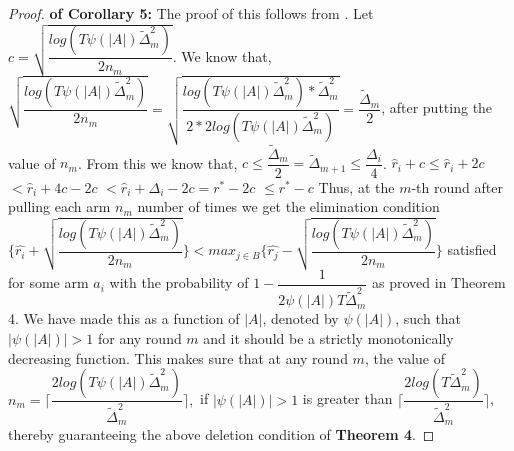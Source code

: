 \begin{proof}\textbf{ of Corollary 5:}
The proof of this follows from \citep{auer2010ucb}. Let $c=\sqrt{\dfrac{log({T\psi(|A|)\tilde{\Delta}_{m}^{2}})}{2n_{m}}} $.
We know  that,
$\sqrt{\dfrac{log({T\psi(|A|)\tilde{\Delta}_{m}^{2}})}{2n_{m}}} = \sqrt{\dfrac{log({T\psi(|A|)\tilde{\Delta}_{m}^{2}}) * \tilde{\Delta}_{m}^{2}}{2 * 2log({T\psi(|A|)\tilde{\Delta}_{m}^{2}})} } = \dfrac{\tilde{\Delta}_{m}}{2}$, after putting the value of $n_{m}$. From this we know that, 
$c \leq \dfrac{\tilde{\Delta}_{m}}{2} =\tilde{\Delta}_{m+1} \leq \dfrac{\Delta_{i}}{4}$.
\newline
\hspace*{8em}$\hat{r}_{i} + c \leq \hat{r}_{i} + 2c $
\newline
\hspace*{11em}$< \hat{r}_{i} + 4c - 2c $
\newline
\hspace*{11em}$< \hat{r}_{i} + \Delta_{i} - 2c = r^{*} - 2c $
\newline
\hspace*{11em}$\leq r^{*} - c$
\newline
Thus, at the $m$-th round after pulling each arm $n_{m}$ number of times we get the elimination condition  $ \bigg\lbrace\hat{r_{i}}+\sqrt{\dfrac{log({T\psi(|A|)\tilde{\Delta}_{m}^{2}})}{2n_{m}}}\bigg\rbrace < max_{j\in B}\bigg\lbrace\hat{r_{j}}-\sqrt{\dfrac{log({T\psi(|A|)\tilde{\Delta}_{m}^{2}})}{2n_{m}}}\bigg\rbrace$ satisfied for some arm $a_{i}$ with the probability of $1 - \dfrac{1}{2\psi(|A|)T\tilde{\Delta}_{m}^{2}}$ as proved in Theorem 4. We have made this as a function of $|A|$, denoted by $\psi(|A|)$, such that $|\psi(|A|)|>1$ for any round $m$ and it should be a strictly monotonically decreasing function. This makes sure that at any round $m$, the value of $n_{m} = \bigg\lceil \dfrac{2log({T\psi(|A|)\tilde{\Delta}_{m}^{2}})}{\tilde{\Delta}_{m}^{2}}\bigg\rceil ,$ if $|\psi(|A|)|> 1$ is greater than $ \bigg\lceil \dfrac{2log({T\tilde{\Delta}_{m}^{2}})}{\tilde{\Delta}_{m}^{2}} \bigg\rceil$, thereby guaranteeing the above deletion condition of \textbf{Theorem 4}.
\end{proof}

